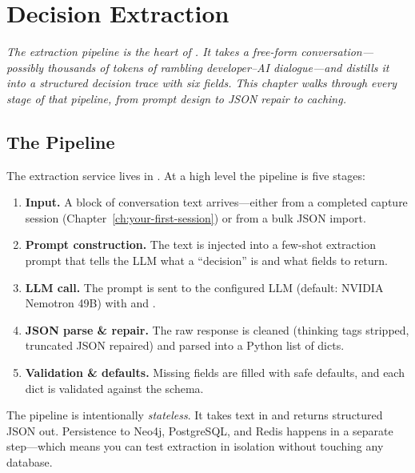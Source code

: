 \chapter{Decision Extraction}
\label{ch:decision-extraction}

\textit{The extraction pipeline is the heart of \sysname{}.  It takes a
free-form conversation---possibly thousands of tokens of rambling
developer--AI dialogue---and distills it into a structured decision trace
with six fields.  This chapter walks through every stage of that pipeline,
from prompt design to JSON repair to caching.}


\section{The Pipeline}
\label{sec:extraction-pipeline}

The extraction service lives in
.  At a high level the pipeline
is five stages:

\begin{enumerate}
  \item \textbf{Input.}  A block of conversation text arrives---either from a
        completed capture session (Chapter~\ref{ch:your-first-session}) or
        from a bulk JSON import.
  \item \textbf{Prompt construction.}  The text is injected into a
        few-shot extraction prompt that tells the LLM what a ``decision''
        is and what fields to return.
  \item \textbf{LLM call.}  The prompt is sent to the configured LLM
        (default: NVIDIA Nemotron 49B) with  and
        .
  \item \textbf{JSON parse \& repair.}  The raw response is cleaned
        (thinking tags stripped, truncated JSON repaired) and parsed into a
        Python list of dicts.
  \item \textbf{Validation \& defaults.}  Missing fields are filled with
        safe defaults, and each dict is validated against the
         schema.
\end{enumerate}

\begin{keyinsight}
The pipeline is intentionally \emph{stateless}.  It takes text in and
returns structured JSON out.  Persistence to Neo4j, PostgreSQL, and Redis
happens in a separate  step---which means you can
test extraction in isolation without touching any database.
\end{keyinsight}


